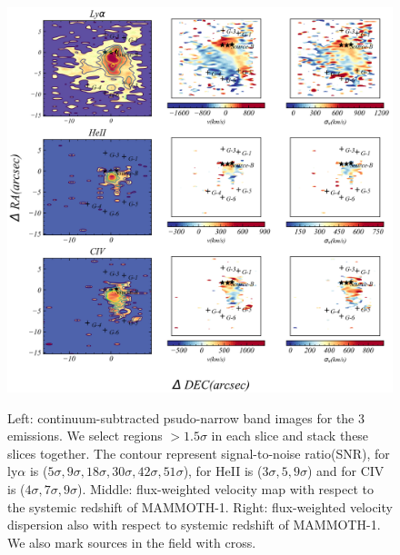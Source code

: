 	 \begin{figure}[htp]
		\centering
		\includegraphics[width=\textwidth]{figs/emissionmap}
		\label{kinematicsmap}
		\caption{Left: continuum-subtracted psudo-narrow band images for the 3 emissions. We select regions $> 1.5\sigma$ in each slice and stack these slices together. The contour represent signal-to-noise ratio(SNR), for ly$\alpha$ is ($5\sigma,9\sigma,18\sigma,30\sigma,42\sigma,51\sigma$), for HeII is ($3\sigma,5,9\sigma$) and for CIV is ($4\sigma,7\sigma,9\sigma$). Middle: flux-weighted velocity map with respect to the systemic redshift of MAMMOTH-1. Right: flux-weighted velocity dispersion also with respect to systemic redshift of MAMMOTH-1. We also mark sources in the field with cross.}
	\end{figure}
	
